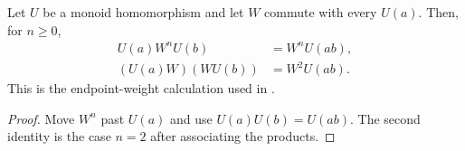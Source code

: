\begin{lemma}%
    \label{thm:peps_monoid_hom_commuting_weight}
    \leanok
    Let $U$ be a monoid homomorphism and let $W$ commute with every $U(a)$.
    Then, for $n\geq 0$,
    \begin{align}
        U(a)W^nU(b)    & =W^nU(ab), \\
        (U(a)W)(WU(b)) & =W^2U(ab).
    \end{align}
    This is the endpoint-weight calculation used in
    \cite[Section~7]{Schuch2010PEPS}.
\end{lemma}

\begin{proof}\leanok
    Move $W^n$ past $U(a)$ and use $U(a)U(b)=U(ab)$.
    The second identity is the case $n=2$ after associating the products.
\end{proof}
